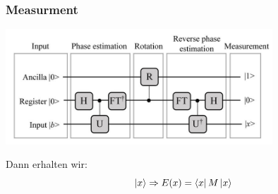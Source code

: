 \begin{frame}
    \frametitle{Measurment}
    \begin{center}
    \includegraphics[width=10cm]{img/hhl_circuit.jpg}
    \end{center}

    
    Dann erhalten wir:
        $$\ket{x} \Rightarrow E(x) = \bra{x}M\ket{x} $$


\end{frame}
